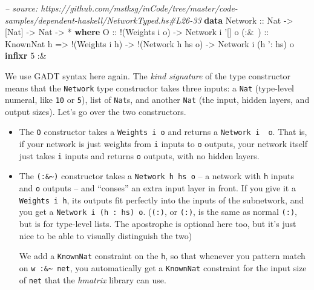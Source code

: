 \documentclass[]{article}
\newenvironment{Shaded}{}{}
\newcommand{\KeywordTok}[1]{\textcolor[rgb]{0.00,0.44,0.13}{\textbf{{#1}}}}
\newcommand{\DataTypeTok}[1]{\textcolor[rgb]{0.56,0.13,0.00}{{#1}}}
\newcommand{\DecValTok}[1]{\textcolor[rgb]{0.25,0.63,0.44}{{#1}}}
\newcommand{\CharTok}[1]{\textcolor[rgb]{0.25,0.44,0.63}{{#1}}}
\newcommand{\CommentTok}[1]{\textcolor[rgb]{0.38,0.63,0.69}{\textit{{#1}}}}
\newcommand{\OtherTok}[1]{\textcolor[rgb]{0.00,0.44,0.13}{{#1}}}
\newcommand{\FunctionTok}[1]{\textcolor[rgb]{0.02,0.16,0.49}{{#1}}}
\newcommand{\NormalTok}[1]{{#1}}
\begin{document}
\begin{Shaded}
\begin{Highlighting}[]
\CommentTok{-- source: https://github.com/mstksg/inCode/tree/master/code-samples/dependent-haskell/NetworkTyped.hs#L26-33}
\KeywordTok{data} \DataTypeTok{Network}\OtherTok{ ::} \DataTypeTok{Nat} \OtherTok{->} \NormalTok{[}\DataTypeTok{Nat}\NormalTok{] }\OtherTok{->} \DataTypeTok{Nat} \OtherTok{->} \FunctionTok{*} \KeywordTok{where}
    \DataTypeTok{O}\OtherTok{     ::} \FunctionTok{!}\NormalTok{(}\DataTypeTok{Weights} \NormalTok{i o)}
          \OtherTok{->} \DataTypeTok{Network} \NormalTok{i }\CharTok{'[] o}
\OtherTok{    (:&~) ::} \DataTypeTok{KnownNat} \NormalTok{h}
          \OtherTok{=>} \FunctionTok{!}\NormalTok{(}\DataTypeTok{Weights} \NormalTok{i h)}
          \OtherTok{->} \FunctionTok{!}\NormalTok{(}\DataTypeTok{Network} \NormalTok{h hs o)}
          \OtherTok{->} \DataTypeTok{Network} \NormalTok{i (h }\CharTok{': hs) o}
\KeywordTok{infixr} \DecValTok{5} \FunctionTok{:&~}
\end{Highlighting}
\end{Shaded}

We use GADT syntax here again. The \emph{kind signature} of the type
constructor means that the \texttt{Network} type constructor takes three
inputs: a \texttt{Nat} (type-level numeral, like \texttt{10} or
\texttt{5}), list of \texttt{Nat}s, and another \texttt{Nat} (the input,
hidden layers, and output sizes). Let's go over the two constructors.

\begin{itemize}
\item
  The \texttt{O} constructor takes a \texttt{Weights\ i\ o} and returns
  a \texttt{Network\ i\ \textquotesingle{}{[}{]}\ o}. That is, if your
  network is just weights from \texttt{i} inputs to \texttt{o} outputs,
  your network itself just takes \texttt{i} inputs and returns
  \texttt{o} outputs, with no hidden layers.
\item
  The \texttt{(:\&\textasciitilde{})} constructor takes a
  \texttt{Network\ h\ hs\ o} -- a network with \texttt{h} inputs and
  \texttt{o} outputs -- and ``conses'' an extra input layer in front. If
  you give it a \texttt{Weights\ i\ h}, its outputs fit perfectly into
  the inputs of the subnetwork, and you get a
  \texttt{Network\ i\ (h\ \textquotesingle{}:\ hs)\ o}.
  (\texttt{(\textquotesingle{}:)}, or \texttt{(:)}, is the same as
  normal \texttt{(:)}, but is for type-level lists. The apostrophe is
  optional here too, but it's just nice to be able to visually
  distinguish the two)

  We add a \texttt{KnownNat} constraint on the \texttt{h}, so that
  whenever you pattern match on \texttt{w\ :\&\textasciitilde{}\ net},
  you automatically get a \texttt{KnownNat} constraint for the input
  size of \texttt{net} that the \emph{hmatrix} library can use.
\end{itemize}
\end{document}
